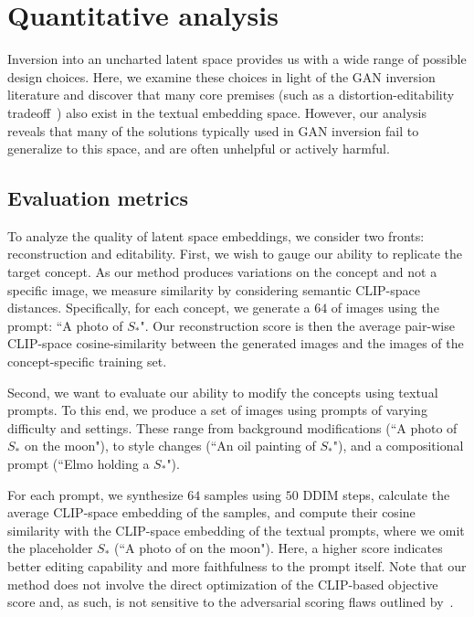 \section{Quantitative analysis}
\label{sec:analysis}

Inversion into an uncharted latent space provides us with a wide range of possible design choices. Here, we examine these choices in light of the GAN inversion literature and discover that many core premises (such as a distortion-editability tradeoff~\citep{tov2021designing,zhu2020improved}) also exist in the textual embedding space. However, our analysis reveals that many of the solutions typically used in GAN inversion fail to generalize to this space, and are often unhelpful or actively harmful.

\subsection{Evaluation metrics}

To analyze the quality of latent space embeddings, we consider two fronts: reconstruction and editability.
First, we wish to gauge our ability to replicate the target concept. As our method produces variations on the concept and not a specific image, we measure similarity by considering semantic CLIP-space distances. Specifically, for each concept, we generate a $64$ of images using the prompt: ``A photo of $S_*$". Our reconstruction score is then the average pair-wise CLIP-space cosine-similarity between the generated images and the images of the concept-specific training set.

Second, we want to evaluate our ability to modify the concepts using textual prompts. To this end, we produce a set of images using prompts of varying difficulty and settings. These range from background modifications (``A photo of $S_*$ on the moon"), to style changes (``An oil painting of $S_*$"), and a compositional prompt (``Elmo holding a $S_*$"). 

For each prompt, we synthesize $64$ samples using $50$ DDIM steps, calculate the average CLIP-space embedding of the samples, and compute their cosine similarity with the CLIP-space embedding of the textual prompts, where we omit the placeholder $S_*$ (\ie ``A photo of on the moon"). Here, a higher score indicates better editing capability and more faithfulness to the prompt itself. Note that our method does not involve the direct optimization of the CLIP-based objective score and, as such, is not sensitive to the adversarial scoring flaws outlined by~\citet{nichol2021glide}.

